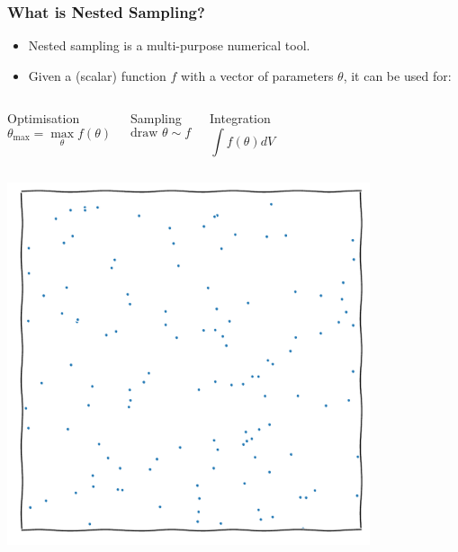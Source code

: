 \documentclass[aspectratio=169]{beamer}
\begin{document}
\begin{frame}
    \frametitle{What is Nested Sampling?}
    \begin{itemize}
        \item Nested sampling is a multi-purpose numerical tool.
        \item Given a (scalar) function $f$ with a vector of parameters $\theta$, it can be used for:
    \end{itemize}
    \vspace{-10pt}
    \begin{columns}[t]
        \begin{block}{Optimisation}
            \vspace{-5pt}
            \[\theta_\text{max} = \max_\theta{f(\theta)}\]
        \end{block}
        \begin{block}{Sampling}
            \vspace{-5pt}
            \[\text{draw }\theta\sim f\]
        \end{block}
        \begin{block}{Integration}
            \vspace{-5pt}
            \[\int f(\theta) dV \]
            \vspace{-15pt}
        \end{block}
    \end{columns}
    \begin{columns}[t]
        \centerline{\includegraphics[width=0.8\textwidth,page=13]{figures/himmelblau}}

\end{columns}
\end{frame}
\end{document}
